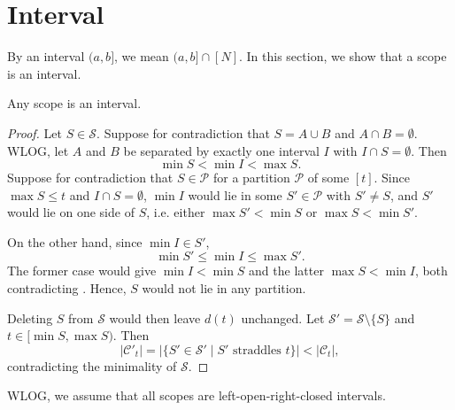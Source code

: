 \section{Interval} \label{sec:interval}
By an interval $(a,b]$, we mean $(a,b]\cap[N]$. In this section, we show that a scope is an interval.
\begin{proposition} \label{proposition:interval}
    Any scope is an interval.
\end{proposition}
\begin{proof}
    Let $S\in\mathcal{S}$. Suppose for contradiction that $S=A\cup B$ and $A\cap B=\emptyset$. WLOG, let $A$ and $B$ be separated by exactly one interval $I$ with $I\cap S=\emptyset$. Then
    \begin{equation} \label{eqn:contradiction}
        \min S<\min I<\max S.
    \end{equation}
    Suppose for contradiction that $S\in\mathcal{P}$ for a partition $\mathcal{P}$ of some $[t]$. Since $\max S\leq t$ and $I\cap S=\emptyset$, $\min I$ would lie in some $S'\in\mathcal{P}$ with $S'\neq S$, and $S'$ would lie on one side of $S$, i.e. either $\max S'<\min S$ or $\max S<\min S'$.

    On the other hand, since $\min I\in S'$,
    \begin{equation*}
        \min S'\leq\min I\leq\max S'.
    \end{equation*}
    The former case would give $\min I<\min S$ and the latter $\max S<\min I$, both contradicting . Hence, $S$ would not lie in any partition.

    Deleting $S$ from $\mathcal{S}$ would then leave $d(t)$ unchanged. Let $\mathcal{S}'=\mathcal{S}\setminus\{S\}$ and $t\in[\min S,\max S)$. Then
    \begin{equation*}
        \lvert\mathcal{C}'_t\rvert=\lvert\{S'\in\mathcal{S}'\mid S' \text{ straddles }t\}\rvert<\lvert\mathcal{C}_t\rvert,
    \end{equation*}
    contradicting the minimality of $\mathcal{S}$.
\end{proof}
WLOG, we assume that all scopes are left-open-right-closed intervals.